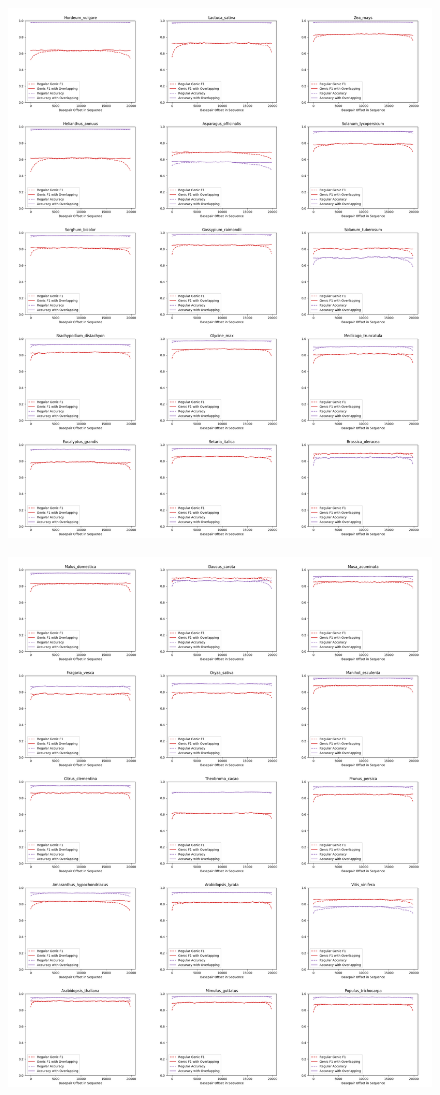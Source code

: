 \documentclass{article}
\begin{document}
\begin{figure}[!h]
\centerline{\includegraphics[width=1.2\textwidth]{images/overlapping/montage_plants1}}
\end{figure}
\begin{figure}[!h]
\centerline{\includegraphics[width=1.2\textwidth]{images/overlapping/montage_plants2}}
\end{figure}
\end{document}
